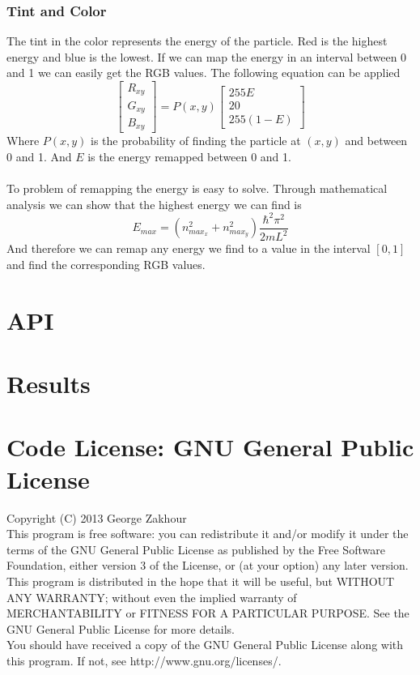 \documentclass[a4paper, 10pt]{article}
\begin{document}
        \subsubsection{Tint and Color}
        The tint in the color represents the energy of the particle. Red is the highest
        energy and blue is the lowest. If we can map the energy in an interval between
        0 and 1 we can easily get the RGB values. The following equation can be applied
        $$ \begin{bmatrix} R_{xy} \\ G_{xy} \\ B_{xy} \end{bmatrix} = P(x, y)
        \begin{bmatrix} 255E \\ 20 \\ 255(1-E) \end{bmatrix} $$
        Where $P(x, y)$ is the probability of finding the particle at $(x, y)$ and between
        0 and 1. And $E$ is the energy remapped between 0 and 1. \\\\
        To problem of remapping the energy is easy to solve. Through mathematical analysis
        we can show that the highest energy we can find is
        $$ E_{max} = (n^2_{max_x} + n^2_{max_y})\frac{\hbar^2\pi^2}{2mL^2} $$
        And therefore we can remap any energy we find to a value in the interval $[0, 1]$
        and find the corresponding RGB values.

\newpage
\section{API}

\newpage
\section{Results}

\newpage
\section{Code License: GNU General Public License}
Copyright (C) 2013 George Zakhour\\

This program is free software: you can redistribute it and/or modify it under
the terms of the GNU General Public License as published by the Free Software
Foundation, either version 3 of the License, or (at your option) any later
version.\\

This program is distributed in the hope that it will be useful, but WITHOUT ANY
WARRANTY; without even the implied warranty of MERCHANTABILITY or FITNESS FOR A
PARTICULAR PURPOSE. See the GNU General Public License for more details.\\

You should have received a copy of the GNU General Public License along with
this program. If not, see http://www.gnu.org/licenses/.\\
\end{document}

